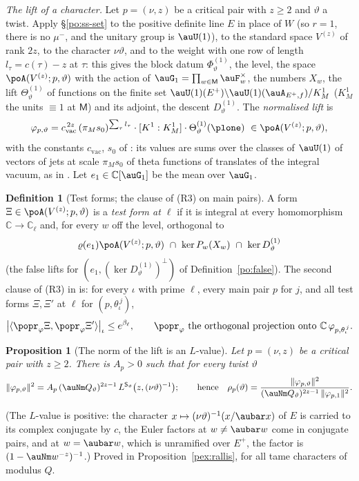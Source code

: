 \documentclass[10pt]{amsart}
\newtheorem{proposition}[theorem]{Proposition}
\theoremstyle{definition}
\newtheorem{definition}[theorem]{Definition}
\theoremstyle{remark}
\newcommand{\C}{\mathbb C}
\begin{document}
\emph{The lift of a character.} Let $p=(\nu,z)$ be a critical pair with $z\ge2$ and $\vartheta$ a
twist. Apply \S\ref{po:ss-set} to the positive definite line $E$ in place of $W$ (so $r=1$, there
is no $\mu^-$, and the unitary group is $\auU(1)$), to the standard space $V^{(z)}$ of rank $2z$,
to the character $\nu\vartheta$, and to the weight with one row of length $l_\tau=c(\tau)-z$ at
$\tau$: this gives the block datum $\Phi^{(1)}_\vartheta$, the level, the space
$\poA(V^{(z)};p,\vartheta)$ with the action of $\auG_1=\prod_{w\in\mathsf M}\auF_w^\times$, the
numbers $X_w$, the lift $\Theta^{(1)}_\vartheta$ of functions on the finite set
$\auU(1)(E^+)\backslash\auU(1)(\auA_{E^+,f})/K^1_M$ ($K^1_M$ the units $\equiv1$ at $\mathsf M$)
and its adjoint, the descent $D^{(1)}_\vartheta$. The \emph{normalised lift} is
\[
\varphi_{p,\vartheta}=c_{\mathrm{vac}}^{\,2z}\,(\pi_Ms_0)^{\sum_\tau l_\tau}\cdot[K^1:K^1_M]\cdot
\Theta^{(1)}_\vartheta(\plone)\ \in\poA(V^{(z)};p,\vartheta),
\]
with the constants $c_{\mathrm{vac}}$, $s_0$ of {\cite[\S5.1.1]{P49}}: its values are sums over the
classes of $\auU(1)$ of vectors of jets at scale $\pi_Ms_0$ of theta functions of translates of
the integral vacuum, as in {\cite[(34)]{P49}}. Let $e_1\in\C[\auG_1]$ be the mean over $\auG_1$.

\begin{definition}[Test forms; the clause of {\rm(R3)} on main pairs]\label{po:R3}
A form $\Xi\in\poA(V^{(z)};p,\vartheta)$ is a \emph{test form at $\ell$} if it is integral at
every homomorphism $\C\to\C_\ell$ and, for every $w$ off the level, orthogonal to
\[
\varrho(e_1)\poA(V^{(z)};p,\vartheta)\ \cap\ \ker P_w(X_w)\ \cap\ \ker D^{(1)}_\vartheta
\]
(the false lifts for $(e_1,(\ker D^{(1)}_\vartheta)^\perp)$ of Definition~\ref{po:false}). The
second clause of {\rm(R3)} in {\cite[Definition~14.39]{P46}} is: for every $\iota$ with prime
$\ell$, every main pair $p$ for $j$, and all test forms $\Xi,\Xi'$ at $\ell$ for
$(p,\theta_\iota^{\,j})$,
\[
\bigl|\langle\popr_\varphi\Xi,\popr_\varphi\Xi'\rangle\bigr|_\iota\le e^{\beta_\ell},\qquad
\popr_\varphi\text{ the orthogonal projection onto }\C\,\varphi_{p,\theta_\iota^{\,j}} .
\]
\end{definition}

\begin{proposition}[The norm of the lift is an $L$-value]\label{po:rallis}
Let $p=(\nu,z)$ be a critical pair with $z\ge2$. There is $A_p>0$ such that for every twist
$\vartheta$
\[
\|\varphi_{p,\vartheta}\|^2=A_p\,(\auNm Q_\vartheta)^{2z-1}\,L^{\mathsf S_\vartheta}\bigl(z,(\nu
\vartheta)^{-1}\bigr);\qquad\text{hence}\quad\rho_p(\vartheta)=\frac{\|\varphi_{p,\vartheta}
\|^2}{(\auNm Q_\vartheta)^{2z-1}\,\|\varphi_{p,1}\|^2} .
\]
\end{proposition}
\noindent(The $L$-value is positive: the character $x\mapsto(\nu\vartheta)^{-1}(x/\aubar x)$ of
$E$ is carried to its complex conjugate by $c$, the Euler factors at $w\ne\aubar w$ come in
conjugate pairs, and at $w=\aubar w$, which is unramified over $E^+$, the factor is
$(1-\auNm w^{-z})^{-1}$.)
\noindent Proved in Proposition~\ref{pex:rallis}, for all tame characters of modulus $Q$.
\end{document}
